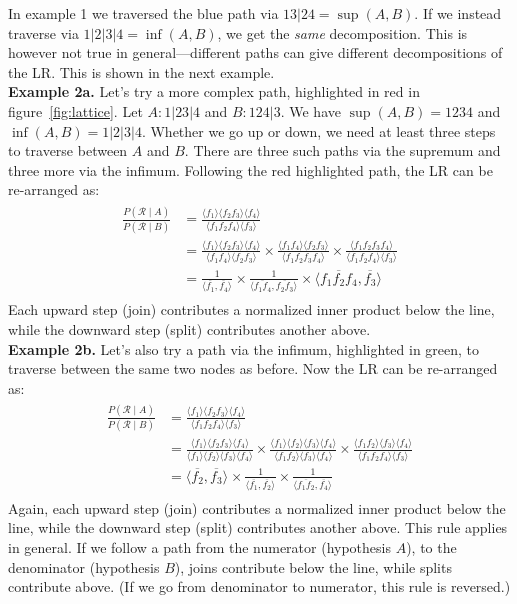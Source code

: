 \documentclass[a4paper,oneside,12pt,english]{report}
\def\expv#1#2{\bigl\langle#1\bigr\rangle_{#2}}
\def\expp#1{\bigl\langle#1\bigr\rangle}
\def\Rset{\mathcal{R}}
\def\dot#1#2{\expv{#1,#2}{}}
\def\normal#1{\overline{#1}}
\def\dotn#1#2{\dot{\normal{#1}}{\normal{#2}}}
\begin{document}
In example 1 we traversed the blue path via $13|24=\sup(A,B)$. If we instead traverse via $1|2|3|4=\inf(A,B)$, we get the \emph{same} decomposition. This is however not true in general---different paths can give different decompositions of the LR. This is shown in the next example.\\

\noindent\textbf{Example 2a.} Let's try a more complex path, highlighted in red in figure~\ref{fig:lattice}. Let $A:1|23|4$ and $B:124|3$. We have $\sup(A,B)=1234$ and $\inf(A,B)=1|2|3|4$. Whether we go up or down, we need at least three steps to traverse between $A$ and $B$. There are three such paths via the supremum and three more via the infimum. Following the red highlighted path, the LR can be re-arranged as:
\begin{align}
\begin{split}
\frac{P(\Rset\mid A)}{P(\Rset\mid B)} &= \frac{\expp{f_1}\expp{f_2f_3}\expp{f_4}}{\expp{f_1f_2f_4}\expp{f_3}}\\
&= \frac{\expp{f_1}\expp{f_2f_3}\expp{f_4}}{\expp{f_1f_4}\expp{f_2f_3}}\times
\frac{\expp{f_1f_4}\expp{f_2f_3}}{\expp{f_1f_2f_3f_4}}\times
\frac{\expp{f_1f_2f_3f_4}}{\expp{f_1f_2f_4}\expp{f_3}}\\
&= \frac1{\dotn{f_1}{f_4}}\times\frac1{\dotn{f_1f_4}{f_2f_3}}\times\dotn{f_1f_2f_4}{f_3}
\end{split}
\end{align}
Each upward step (join) contributes a normalized inner product below the line, while the downward step (split) contributes another above.\\

\noindent\textbf{Example 2b.} Let's also try a path via the infimum, highlighted in green, to traverse between the same two nodes as before. Now the LR can be re-arranged as:
\begin{align}
\begin{split}
\frac{P(\Rset\mid A)}{P(\Rset\mid B)} &= \frac{\expp{f_1}\expp{f_2f_3}\expp{f_4}}{\expp{f_1f_2f_4}\expp{f_3}}\\
&= \frac{\expp{f_1}\expp{f_2f_3}\expp{f_4}}{\expp{f_1}\expp{f_2}\expp{f_3}\expp{f_4}}\times
\frac{\expp{f_1}\expp{f_2}\expp{f_3}\expp{f_4}}{\expp{f_1f_2}\expp{f_3}\expp{f_4}}\times
\frac{\expp{f_1f_2}\expp{f_3}\expp{f_4}}{\expp{f_1f_2f_4}\expp{f_3}}\\
&= \dotn{f_2}{f_3}\times\frac{1}{\dotn{f_1}{f_2}}\times\frac1{\dotn{f_1f_2}{f_4}}
\end{split}
\end{align}
Again, each upward step (join) contributes a normalized inner product below the line, while the downward step (split) contributes another above. This rule applies in general. If we follow a path from the numerator (hypothesis $A$), to the denominator (hypothesis $B$), joins contribute below the line, while splits contribute above. (If we go from denominator to numerator, this rule is reversed.)  
\end{document}

